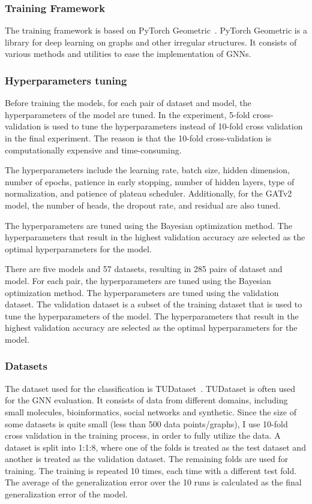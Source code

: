 \documentclass{article}
\begin{document}
\subsubsection{Training Framework}
The training framework is based on PyTorch Geometric~\cite{fey2019fast}. PyTorch Geometric is a library for deep learning on graphs and other irregular structures. It consists of various methods and utilities to ease the implementation of GNNs. 

\subsubsection{Hyperparameters tuning}
Before training the models, for each pair of dataset and model, the hyperparameters of the model are tuned. In the experiment, 5-fold cross-validation is used to tune the hyperparameters instead of 10-fold cross validation in the final experiment. The reason is that the 10-fold cross-validation is computationally expensive and time-consuming. 

The hyperparameters include the learning rate, batch size, hidden dimension, number of epochs, patience in early stopping, number of hidden layers, type of normalization, and patience of plateau scheduler. Additionally, for the GATv2 model, the number of heads, the dropout rate, and residual are also tuned.

The hyperparameters are tuned using the Bayesian optimization method\cite{frazier2018tutorial}. The hyperparameters that result in the highest validation accuracy are selected as the optimal hyperparameters for the model. 

There are five models and 57 datasets, resulting in 285 pairs of dataset and model. For each pair, the hyperparameters are tuned using the Bayesian optimization method. The hyperparameters are tuned using the validation dataset. The validation dataset is a subset of the training dataset that is used to tune the hyperparameters of the model. The hyperparameters that result in the highest validation accuracy are selected as the optimal hyperparameters for the model.

\subsubsection{Datasets}
The dataset used for the classification is TUDataset~\cite{morris2020tudataset}. TUDataset is often used for the GNN evaluation. It consists of data from different domains, including small molecules, bioinformatics, social networks and synthetic. Since the size of some datasets is quite small (less than 500 data points/graphs), I use 10-fold cross validation in the training process, in order to fully utilize the data. A dataset is split into 1:1:8, where one of the folds is treated as the test dataset and another is treated as the validation dataset. The remaining folds are used for training. The training is repeated 10 times, each time with a different test fold. The average of the generalization error over the 10 runs is calculated as the final generalization error of the model.
\end{document}
